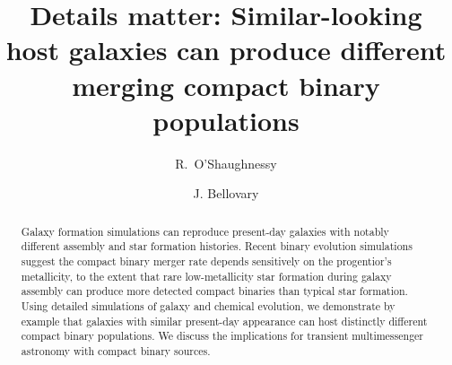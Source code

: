 \documentclass[nofootinbib,twocolumn,prd]{emulateapj}
\begin{document}
\title{Details matter: Similar-looking host galaxies can produce different merging compact binary populations} 
\author{R.\ O'Shaughnessy}
\author{ J. Bellovary}
\begin{abstract}
Galaxy formation
simulations can reproduce present-day galaxies with notably different assembly and star formation histories.  
Recent binary evolution simulations suggest the compact binary merger rate depends
sensitively on the progentior's metallicity, to the extent that rare low-metallicity star formation during galaxy
assembly can produce more detected compact binaries than typical star formation.   
Using detailed simulations of galaxy and chemical evolution, we demonstrate by example that galaxies with similar present-day appearance can host distinctly different
compact binary populations.
We discuss the implications for transient multimessenger astronomy with compact binary sources. 

\end{abstract}
\end{document}
